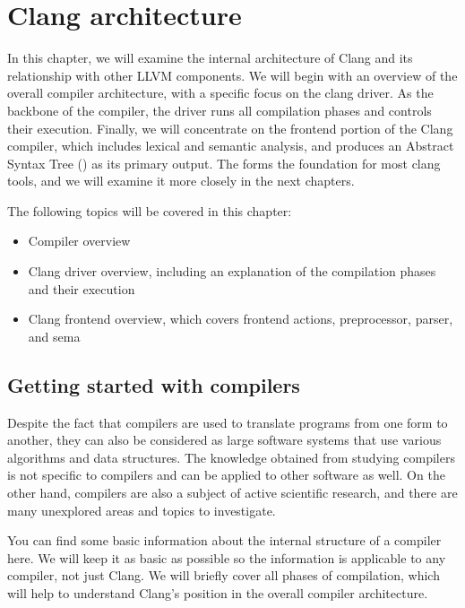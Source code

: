 \chapter{Clang architecture}
\pagestyle{fancy}
\fancyhf{}
\rhead{\thepage}

In this chapter, we will examine the internal architecture of Clang and its
relationship with other LLVM components. We will begin with an overview of the
overall compiler architecture, with a specific focus on the clang driver. As the
backbone of the compiler, the driver runs all compilation phases and controls
their execution. Finally, we will concentrate on the frontend portion of the
Clang compiler, which includes lexical and semantic analysis, and produces an
Abstract Syntax Tree (\myast) as its primary output. The \myast forms the
foundation for most clang tools, and we will examine it more closely in the next
chapters. 

The following topics will be covered in this chapter:
\begin{itemize}
\item Compiler overview
\item Clang driver overview, including an explanation of the compilation phases
  and their execution 
\item Clang frontend overview, which covers frontend actions, preprocessor,
  parser, and sema 
\end{itemize}

\section{Getting started with compilers}
\label{sec:compiler_overview}
Despite the fact that compilers are used to translate programs from one form to
another, they can also be considered as large software systems that use various
algorithms and data structures. The knowledge obtained from studying compilers
is not specific to compilers and can be applied to other software as well. On
the other hand, compilers are also a subject of active scientific research, and
there are many unexplored areas and topics to investigate. 

You can find some basic information about the internal structure of a compiler
here. We will keep it as basic as possible so the information is applicable
to any compiler, not just Clang. We will briefly cover all phases of
compilation, which will help to understand Clang's position in the overall
compiler architecture.

